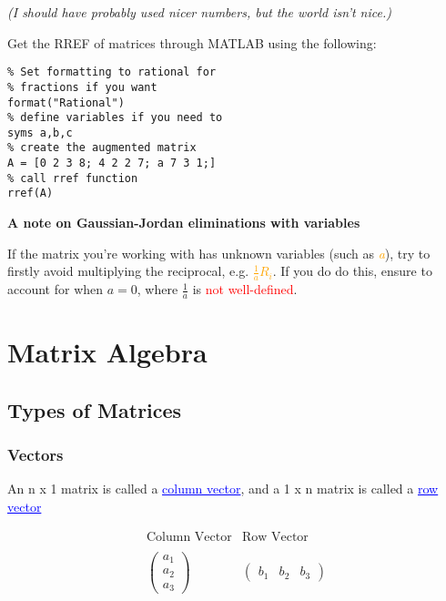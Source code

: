 \documentclass{article}
\newcommand{\bul}[1]{\textcolor{blue}{\underline{#1}}}
\begin{document}
\vspace{2pt}

\textit{(I should have probably used nicer numbers, but the world isn't nice.)}

\vspace{10pt}

\begin{tcolorbox}[title=MATLAB tip, colback=blue!5, colframe=blue!80!black]
    Get the RREF of matrices through MATLAB using the following:
    \begin{lstlisting}
% Set formatting to rational for
% fractions if you want
format("Rational")
% define variables if you need to
syms a,b,c
% create the augmented matrix 
A = [0 2 3 8; 4 2 2 7; a 7 3 1;]
% call rref function
rref(A)
    \end{lstlisting}
\end{tcolorbox}

\vspace{10pt}

\textbf{A note on Gaussian-Jordan eliminations with variables}

If the matrix you're working with has unknown variables (such as \textcolor{orange}{\textit{a}}), try to firstly avoid multiplying the reciprocal, e.g. \textcolor{orange}{$\frac{1}{a}R_i$}. If you do do this, ensure to account for when $a=0$, where $\frac{1}{a}$ is \textcolor{red}{not well-defined}.

\section{Matrix Algebra}

\subsection{Types of Matrices}

\subsubsection{Vectors}
An n x 1 matrix is called a \bul{column vector}, and a 1 x n matrix is called a \bul{row vector}

\[
\begin{array}{c|c}
\text{Column Vector} & \text{Row Vector} \\ \\
\begin{pmatrix}
a_1 \\
a_2 \\
a_3 
\end{pmatrix}
& 
\begin{pmatrix}
b_1 & b_2 & b_3 
\end{pmatrix}
\end{array}
\]
\end{document}
